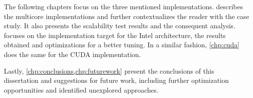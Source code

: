 \documentclass[../thesis]{subfiles}
\begin{document}
	The following chapters focus on the three mentioned implementations.  describes the multicore implementations and further contextualizes the reader with the case study. It also presents the scalability test results and the consequent analysis.  focuses on the implementation target for the Intel \mic architecture, the results obtained and optimizations for a better tuning. In a similar fashion, \cref{chp:cuda} does the same for the CUDA implementation.

	Lastly, \cref{chp:conclusions,chp:futurework} present the conclusions of this dissertation and suggestions for future work, including further optimization opportunities and identified unexplored approaches.

\end{document}
